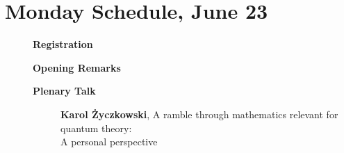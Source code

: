 \documentclass[ILAS2025-program.tex]{subfiles}
\begin{document}
\section{Monday Schedule, June 23}
    
    \begin{description}
    \item[] \textbf{Registration} 
    \item[] \textbf{Opening Remarks} 
    \item[] \textbf{Plenary Talk} 
    \begin{description}
        \item[] \textbf{Karol Życzkowski}, A ramble through mathematics relevant for quantum theory: \\  A personal perspective


\end{description}
\end{description}
\end{document}

